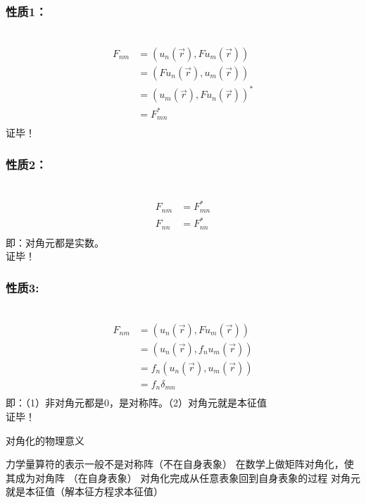 \begin{frame}
    \frametitle{性质1：}
    \例[6.试证明力学量算符的矩阵表示都是厄密矩阵]{}
    \证~ 
    \begin{equation*}
        \begin{split}
            F_{nm}&=(u_n (\vec{r}), Fu_m(\vec{r}))\\
            &=(Fu_n (\vec{r}), u_m(\vec{r}))\\
            &=(u_m(\vec{r}), Fu_n (\vec{r}))^*\\
            &=F_{mn}^*\\
        \end{split} 
    \end{equation*}
    证毕！
\end{frame}

\begin{frame}
    \frametitle{性质2：}
    \证~ 
    \begin{equation*}
        \begin{split}
            F_{nm}&=F_{mn}^*\\
            F_{nn}&=F_{nn}^*\\
        \end{split} 
    \end{equation*}
    即：对角元都是实数。 \\
    证毕！
\end{frame}

\begin{frame}
    \frametitle{性质3:}
    \证~ 
    \begin{equation*}
        \begin{split}
            F_{nm}&=(u_n (\vec{r}), Fu_m(\vec{r}))\\
            &=(u_n (\vec{r}), f_nu_m(\vec{r}))\\
            &=f_n(u_n (\vec{r}), u_m(\vec{r}))\\
            &=f_n\delta_{mn}\\
        \end{split} 
    \end{equation*}
    即：（1）非对角元都是0，是对称阵。（2）对角元就是本征值\\
    证毕！
\end{frame}

\begin{frame} [allowframebreaks=]
    \begin{tcolorbox2}{对角化的物理意义}
        \begin{itemize}
            \Item 力学量算符的表示一般不是对称阵（不在自身表象）
            \Item 在数学上做矩阵对角化，使其成为对角阵 （在自身表象）
            \Item 对角化完成从任意表象回到自身表象的过程
            \Item 对角元就是本征值（解本征方程求本征值）
        \end{itemize}  
    \end{tcolorbox2}
\end{frame}

